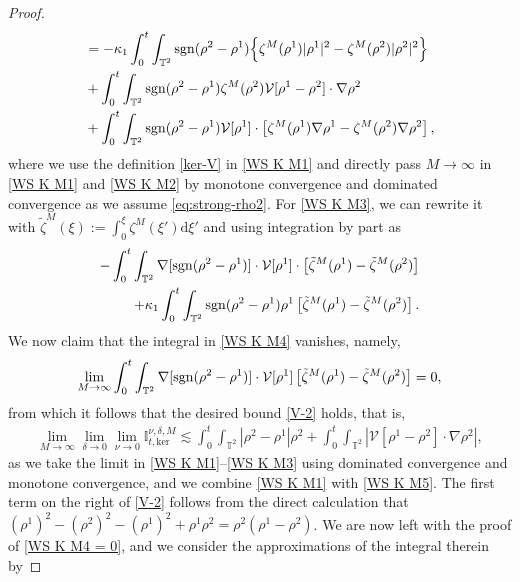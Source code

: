 \begin{proof}
\begin{align}
& = - \kappa_1 \int^t_0\int_{\mathbb{T}^2} \operatorname{sgn}(\rho^2 - \rho^1) \Big\{ \zeta^M(\rho^1) |\rho^1|^2 - \zeta^M(\rho^2) |\rho^2|^2\Big\}\label{WS K M1}\\
& + \int^t_0\int_{\mathbb{T}^2} \operatorname{sgn}(\rho^2 - \rho^1)  \zeta^M(\rho^2) \mathcal{V}[\rho^1 - \rho^2]\cdot \nabla\rho^2\label{WS K M2}\\
& + \int^t_0\int_{\mathbb{T}^2} \operatorname{sgn}(\rho^2 - \rho^1) \mathcal{V}[\rho^1]\cdot \left[\zeta^M(\rho^1) \nabla \rho^1 -\zeta^M(\rho^2) \nabla \rho^2\right]\label{WS K M3},
\end{align}
where we use the definition \eqref{ker-V} in \eqref{WS K M1} and directly pass $M\to \infty$ in \eqref{WS K M1} and \eqref{WS K M2} by monotone convergence and dominated convergence as we assume \eqref{eq:strong-rho2}. For \eqref{WS K M3}, we can rewrite it with $\tilde{\zeta}^M(\xi) := \int_0^{\xi} \zeta^M(\xi')\mathrm{d}\xi'$ and using integration by part as 
\begin{align}
- \int^t_0\int_{\mathbb{T}^2} \nabla [\operatorname{sgn}(\rho^2 - \rho^1)] \cdot \mathcal{V}[\rho^1]\cdot \left[\tilde{\zeta}^M(\rho^1)  -\tilde{\zeta}^M(\rho^2) \right]\label{WS K M4}\\
+ \kappa_1 \int^t_0\int_{\mathbb{T}^2} \operatorname{sgn}(\rho^2 - \rho^1) \rho^1  \left[\tilde{\zeta}^M(\rho^1)  -\tilde{\zeta}^M(\rho^2) \right].\label{WS K M5}
\end{align}
We now claim that the integral in \eqref{WS K M4} vanishes, namely, 
\begin{align}\label{WS K M4 = 0}
\lim_{M \to \infty} \int^t_0\int_{\mathbb{T}^2} \nabla [\operatorname{sgn}(\rho^2 - \rho^1)] \cdot \mathcal{V}[\rho^1] \left[\tilde{\zeta}^M(\rho^1)  -\tilde{\zeta}^M(\rho^2) \right] = 0, 
\end{align}
from which it follows that the desired bound \eqref{V-2} holds, that is, 
\begin{align*}
\lim_{M \to \infty}\lim_{\delta\rightarrow 0} \lim_{\nu\rightarrow 0}\mathbb{I}^{\nu,\delta,M}_{t,\mathrm{ker}} \lesssim \int^t_0\int_{\mathbb{T}^2} |\rho^2 - \rho^1| \rho^2 + \int^t_0\int_{\mathbb{T}^2} \left| \mathcal{V}[\rho^1 - \rho^2]\cdot \nabla\rho^2\right|,
\end{align*}
as we take the limit in \eqref{WS K M1}--\eqref{WS K M3} using dominated convergence and monotone convergence, and we combine \eqref{WS K M1} with \eqref{WS K M5}. The first term on the right of \eqref{V-2} follows from the direct calculation that $(\rho^1)^2 - (\rho^2)^2 - (\rho^1)^2 + \rho^1\rho^2 = \rho^2(\rho^1 - \rho^2)$. We are now left with the proof of \eqref{WS K M4 = 0}, and we consider the approximations of the integral therein by 

\end{proof}
